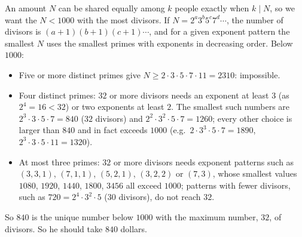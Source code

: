 An amount $N$ can be shared equally among $k$ people exactly when $k\mid N$, so we want the $N<1000$ with the most divisors. If $N=2^a3^b5^c7^d\cdots$, the number of divisors is $(a+1)(b+1)(c+1)\cdots$, and for a given exponent pattern the smallest $N$ uses the smallest primes with exponents in decreasing order. Below $1000$:
\begin{itemize}
\item Five or more distinct primes give $N\ge2\cdot3\cdot5\cdot7\cdot11=2310$: impossible.
\item Four distinct primes: $32$ or more divisors needs an exponent at least $3$ (as $2^4=16<32$) or two exponents at least $2$. The smallest such numbers are $2^3\cdot3\cdot5\cdot7=840$ ($32$ divisors) and $2^2\cdot3^2\cdot5\cdot7=1260$; every other choice is larger than $840$ and in fact exceeds $1000$ (e.g.\ $2\cdot3^3\cdot5\cdot7=1890$, $2^3\cdot3\cdot5\cdot11=1320$).
\item At most three primes: $32$ or more divisors needs exponent patterns such as $(3,3,1)$, $(7,1,1)$, $(5,2,1)$, $(3,2,2)$ or $(7,3)$, whose smallest values $1080$, $1920$, $1440$, $1800$, $3456$ all exceed $1000$; patterns with fewer divisors, such as $720=2^4\cdot3^2\cdot5$ ($30$ divisors), do not reach $32$.
\end{itemize}
So $840$ is the unique number below $1000$ with the maximum number, $32$, of divisors. So he should take $\boxed{840}$ dollars.
